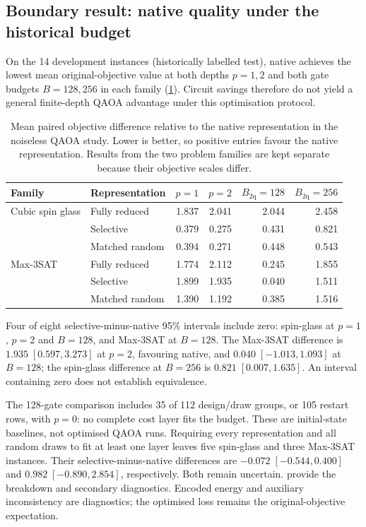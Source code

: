 \documentclass[a4paper,onecolumn,11pt,unpublished]{quantumarticle}
\theoremstyle{remark}
\begin{document}
\subsection{Boundary result: native quality under the historical budget}
\label{sec:results-qaoa}

On the 14 development instances (historically labelled test), native achieves the lowest mean
original-objective value at both depths $p=1,2$ and both gate budgets
$B=128,256$ in each family (\cref{tab:e3-qaoa-summary}). Circuit savings
therefore do not yield a general finite-depth QAOA advantage under this
optimisation protocol.

\begin{table}[!htbp]
    \centering
    \small
    \caption{Mean paired objective difference relative to the native
    representation in the noiseless QAOA study.  Lower is better, so positive
    entries favour the native representation.  Results from the two problem
    families are kept separate because their objective scales differ.}
    \label{tab:e3-qaoa-summary}
    \begin{tabular}{@{}llrrrr@{}}
        \toprule
        Family & Representation
        & $p=1$ & $p=2$
        & $B_{\mathrm{2q}}=128$
        & $B_{\mathrm{2q}}=256$\\
        \midrule
        Cubic spin glass
        & Fully reduced  & 1.837 & 2.041 & 2.044 & 2.458\\
        & Selective      & 0.379 & 0.275 & 0.431 & 0.821\\
        & Matched random & 0.394 & 0.271 & 0.448 & 0.543\\
        \addlinespace
        Max-3SAT
        & Fully reduced  & 1.774 & 2.112 & 0.245 & 1.855\\
        & Selective      & 1.899 & 1.935 & 0.040 & 1.511\\
        & Matched random & 1.390 & 1.192 & 0.385 & 1.516\\
        \bottomrule
    \end{tabular}
\end{table}

Four of eight selective-minus-native 95\% intervals include zero: spin-glass
at $p=1$, $p=2$ and $B=128$, and Max-3SAT at $B=128$. The Max-3SAT difference is
$1.935\;[0.597,3.273]$ at $p=2$, favouring native, and
$0.040\;[-1.013,1.093]$ at $B=128$; the spin-glass difference at $B=256$
is $0.821\;[0.007,1.635]$. An interval containing zero does not
establish equivalence.

The 128-gate comparison includes 35 of 112 design/draw groups, or 105
restart rows, with $p=0$: no complete cost layer fits the budget. These are
initial-state baselines, not optimised QAOA runs. Requiring every
representation and all random draws to fit at least one layer leaves five
spin-glass and three Max-3SAT instances. Their selective-minus-native
differences are $-0.072\;[-0.544,0.400]$ and
$0.982\;[-0.890,2.854]$, respectively. Both remain uncertain.
 provide the breakdown and
secondary diagnostics. Encoded energy and auxiliary inconsistency are
diagnostics; the optimised loss remains the original-objective expectation.
\end{document}
